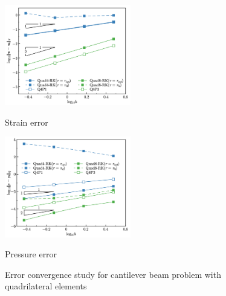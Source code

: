 \begin{figure}[H]
\centering
\begin{subcaptiongroup}
\centering
\parbox[b]{0.49\textwidth}{
    \includegraphics[width=0.49\textwidth]{png/cantilever_Hdev_r1.png}
    \caption{Strain error}\label{fg:cantilever_convergence_strain}
}
\parbox[b]{0.49\textwidth}{
    \includegraphics[width=0.49\textwidth]{png/cantilever_L2_p_r1.png}
    \caption{Pressure error}\label{fg:cantilever_convergence_pressure}
}
\end{subcaptiongroup}
\caption{Error convergence study for cantilever beam problem with quadrilateral elements}\label{fg:cantilever_convergence}
\end{figure}

